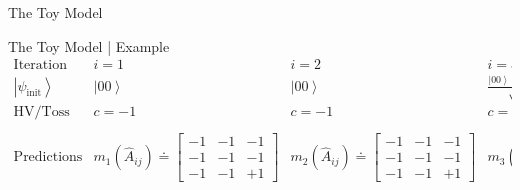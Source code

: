 \documentclass[final,hyperref={pdfpagelabels=false}]{beamer}
\begin{document}
\begin{frame}[t]
\begin{columns}[c]
\begin{column}{.32\textwidth}
\begin{block}{The Toy Model}
  \end{block}
  \begin{block}{The Toy Model | Example}
    {\small
    \begin{equation}
      \begin{array}{c|ccc}
        \text{Iteration} & i=1 & i=2 & i=3\\
        \left|\psi_{\text{init}}\right\rangle  & \left|00\right\rangle  & \left|00\right\rangle  & \frac{\left|00\right\rangle +\left|11\right\rangle }{\sqrt{2}}\\
        \text{HV/Toss} & c=-1 & c=-1 & c=+1\\
        \\
        \text{Predictions} & m_{1}(\hat{A}_{ij})\doteq\left[\begin{array}{ccc}
                                                              -1 & -1 & -1\\
                                                              -1 & -1 & -1\\
                                                              -1 & -1 & +1
                                                            \end{array}\right] & m_{2}(\hat{A}_{ij})\doteq\left[\begin{array}{ccc}
                                                                                                                  -1 & -1 & -1\\
                                                                                                                  -1 & -1 & -1\\
                                                                                                                  -1 & -1 & +1
                                                                                                                \end{array}\right] & m_{3}(\hat{A}_{ij})\doteq\left[\begin{array}{ccc}
                                                                                                                                                                      +1 & +1 & +1\\
                                                                                                                                                                      +1 & +1 & -1\\
                                                                                                                                                                      +1 & +1 & +1

\end{array}
\end{array}
\end{equation}}
\end{block}
\end{column}
\end{columns}
\end{frame}
\end{document}
